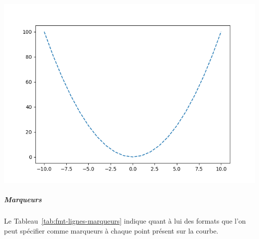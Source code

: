 \documentclass[
  12pt,
]{book}
\numberwithin{equation}{section}
\numberwithin{countremarque}{section}
\begin{document}
\begin{center}\includegraphics[width=9.03in]{figs/pyplot/lignes_linestyle} \end{center}

\subparagraph{Marqueurs}\label{marqueurs}

Le Tableau~\ref{tab:fmt-lignes-marqueurs} indique quant à lui des formats que l'on peut spécifier comme marqueurs à chaque point présent sur la courbe.
\end{document}
